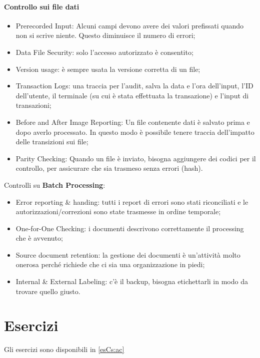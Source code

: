 \paragraph{Controllo sui file dati}
\begin{itemize}
\item Prerecorded Input: Alcuni campi devono avere dei valori prefissati
quando non si scrive niente. Questo diminuisce il numero di errori;

\item Data File Security: solo l'accesso autorizzato è consentito;
\item Version usage: è sempre usata la versione corretta di un file;
\item Transaction Logs: una traccia per l'audit, salva la data e l'ora dell'input,
l'ID dell'utente, il terminale (su cui è stata effettuata la transazione) e
l'input di transazioni;
\item Before and After Image Reporting: Un file contenente dati è salvato
prima e dopo averlo processato. In questo modo è possibile tenere traccia
dell'impatto delle transizioni sui file;
\item Parity Checking: Quando un file è inviato, bisogna aggiungere dei codici
per il controllo, per assicurare che sia trasmeso senza errori (hash).
\end{itemize}

Controlli su \textbf{Batch Processing}:
\begin{itemize}
\item
Error reporting \& handing: tutti i report di errori sono stati riconciliati
e le autorizzazioni/correzioni sono state trasmesse in ordine temporale;
\item
One-for-One Checking: i documenti descrivono correttamente il processing
che è avvenuto;
\item
Source document retention: la gestione dei documenti è un'attività molto
onerosa perché richiede che ci sia una organizzazione in piedi;
\item
Internal \& External Labeling: c'è il backup, bisogna etichettarli in 
modo da trovare quello giusto.
\end{itemize}





\section{Esercizi}

Gli esercizi sono disponibili in \ref{esCs:ac}

